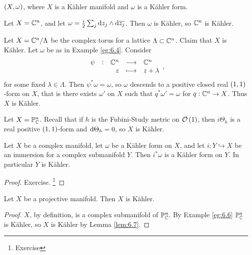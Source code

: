 \begin{notation*}
$ \br{X, \omega} $, where $ X $ is a K\"ahler manifold and $ \omega $ is a K\"ahler form.
\end{notation*}

\begin{example}
\label{eg:6.4}
Let $ X = \mathbb{C}^n $, and let $ \omega = \tfrac{i}{2}\sum_j \mathrm{d} z_j \wedge \mathrm{d}\overline{z_j} $. Then $ \omega $ is K\"ahler, so $ \mathbb{C}^n $ is K\"ahler.
\end{example}

\begin{example}
Let $ X = \mathbb{C}^n / \Lambda $ be the complex torus for a lattice $ \Lambda \subset \mathbb{C}^n $. Claim that $ X $ is K\"ahler. Let $ \omega $ be as in Example \ref{eg:6.4}. Consider
$$ \function[\psi]{\CC^n}{\CC^n}{z}{z + \lambda}, $$
for some fixed $ \lambda \in \Lambda $. Then $ \psi^*\omega = \omega $, so $ \omega $ descends to a positive closed real $ \br{1, 1} $-form on $ X $, that is there exists $ \omega' $ on $ X $ such that $ q^*\omega' = \omega $ for $ q : \mathbb{C}^n \to X $. Thus $ X $ is K\"ahler.
\end{example}

\begin{example}
\label{eg:6.6}
Let $ X = \mathbb{P}_{\mathbb{C}}^n $. Recall that if $ h $ is the Fubini-Study metric on $ \OOO\br{1} $, then $ i\Theta_h $ is a real positive $ \br{1, 1} $-form and $ \mathrm{d}\Theta_h = 0 $, so $ X $ is K\"ahler.
\end{example}

\begin{lemma}
\label{lem:6.7}
Let $ X $ be a complex manifold, let $ \omega $ be a K\"ahler form on $ X $, and let $ i : Y \hookrightarrow X $ be an immersion for a complex submanifold $ Y $. Then $ i^*\omega $ is a K\"ahler form on $ Y $. In particular $ Y $ is K\"ahler.
\end{lemma}

\begin{proof}
Exercise. \footnote{Exercise}
\end{proof}

\begin{corollary}
Let $ X $ be a projective manifold. Then $ X $ is K\"ahler.
\end{corollary}

\begin{proof}
$ X $, by definition, is a complex submanifold of $ \mathbb{P}_{\mathbb{C}}^n $. By Example \ref{eg:6.6} $ \mathbb{P}_{\mathbb{C}}^n $ is K\"ahler, so $ X $ is K\"ahler by Lemma \ref{lem:6.7}.
\end{proof}

